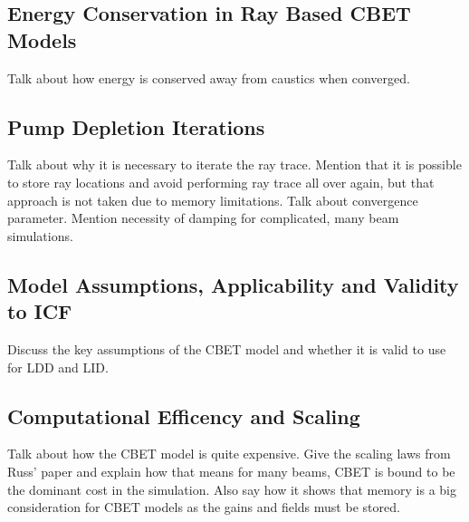 \subsection{Energy Conservation in Ray Based CBET Models}

Talk about how energy is conserved away from caustics when converged.

\subsection{Pump Depletion Iterations}%
\label{sec:pump_dep_iters}

Talk about why it is necessary to iterate the ray trace.
Mention that it is possible to store ray locations and avoid performing ray trace all over again, but that approach is not taken due to memory limitations.
Talk about convergence parameter.
Mention necessity of damping for complicated, many beam simulations.

\subsection{Model Assumptions, Applicability and Validity to ICF}%
\label{sec:model_appliciability}

Discuss the key assumptions of the CBET model and whether it is valid to use for LDD and LID.

\subsection{Computational Efficency and Scaling}

Talk about how the CBET model is quite expensive.
Give the scaling laws from Russ' paper and explain how that means for many beams, CBET is bound to be the dominant cost in the simulation.
Also say how it shows that memory is a big consideration for CBET models as the gains and fields must be stored.


